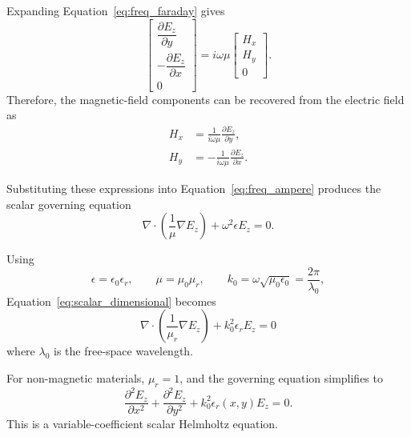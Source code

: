 \documentclass{article}
\begin{document}
Expanding Equation~\eqref{eq:freq_faraday} gives
\begin{equation}
    \begin{bmatrix}
        \dfrac{\partial E_z}{\partial y}\\[4pt]
        -\dfrac{\partial E_z}{\partial x}\\[4pt]
        0
    \end{bmatrix}
    =
    i\omega\mu
    \begin{bmatrix}
        H_x\\H_y\\0
    \end{bmatrix}.
\end{equation}
Therefore, the magnetic-field components can be recovered from the
electric field as
\begin{align}
    H_x &=
    \frac{1}{i\omega\mu}\frac{\partial E_z}{\partial y},
    \label{eq:hx}\\
    H_y &=
    -\frac{1}{i\omega\mu}\frac{\partial E_z}{\partial x}.
    \label{eq:hy}
\end{align}

Substituting these expressions into Equation~\eqref{eq:freq_ampere}
produces the scalar governing equation
\begin{equation}
    \nabla\cdot\left(\frac{1}{\mu}\nabla E_z\right)
    +\omega^2\epsilon E_z=0.
    \label{eq:scalar_dimensional}
\end{equation}

Using
\begin{equation}
    \epsilon=\epsilon_0\epsilon_r,\qquad
    \mu=\mu_0\mu_r,\qquad
    k_0=\omega\sqrt{\mu_0\epsilon_0}
       =\frac{2\pi}{\lambda_0},
\end{equation}
Equation~\eqref{eq:scalar_dimensional} becomes
\begin{equation}
    \boxed{
    \nabla\cdot\left(\frac{1}{\mu_r}\nabla E_z\right)
    +k_0^2\epsilon_r E_z=0
    }
    \label{eq:governing}
\end{equation}
where $\lambda_0$ is the free-space wavelength.

For non-magnetic materials, $\mu_r=1$, and the governing equation
simplifies to
\begin{equation}
    \boxed{
    \frac{\partial^2 E_z}{\partial x^2}
    +\frac{\partial^2 E_z}{\partial y^2}
    +k_0^2\epsilon_r(x,y)E_z=0.
    }
    \label{eq:helmholtz}
\end{equation}
This is a variable-coefficient scalar Helmholtz equation.
\end{document}
